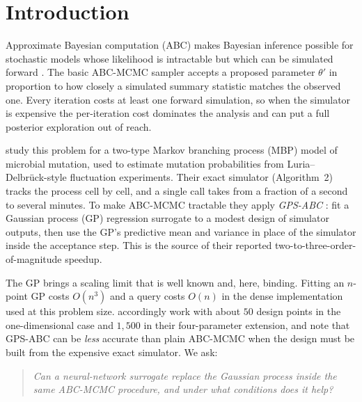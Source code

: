 \documentclass[sn-basic,iicol,pdflatex]{sn-jnl}
\begin{document}
\maketitle


\section{Introduction}
\label{sec:intro}

Approximate Bayesian computation (ABC) makes Bayesian inference possible for
stochastic models whose likelihood is intractable but which can be simulated
forward \citep{beaumont2002,marjoram2003,marin2012,sunnaker2013}. The basic ABC-MCMC sampler
\citep{marjoram2003} accepts a proposed parameter $\theta'$ in proportion to how
closely a simulated summary statistic matches the observed one. Every iteration
costs at least one forward simulation, so when the simulator is expensive the
per-iteration cost dominates the analysis and can put a full posterior
exploration out of reach.

\citet{lu2023} study this problem for a two-type Markov branching process (MBP)
model of microbial mutation, used to estimate mutation probabilities from
Luria--Delbr\"uck-style fluctuation experiments. Their exact simulator
(Algorithm~2) tracks the process cell by cell, and a single call takes from a
fraction of a second to several minutes. To make ABC-MCMC tractable they apply
\emph{GPS-ABC} \citep{meeds2014}: fit a Gaussian process (GP) regression \citep{rasmussen2006}
surrogate to a modest design of simulator outputs, then use the GP's predictive
mean and variance in place of the simulator inside the acceptance step. This is
the source of their reported two-to-three-order-of-magnitude speedup.

The GP brings a scaling limit that is well known and, here, binding. Fitting an
$n$-point GP costs $O(n^3)$ and a query costs $O(n)$ in the dense
implementation used at this problem size. \citet{lu2023} accordingly work with
about $50$ design points in the one-dimensional case and $1{,}500$ in their
four-parameter extension, and note that GPS-ABC can be \emph{less} accurate than
plain ABC-MCMC when the design must be built from the expensive exact simulator.
We ask:

\begin{quote}
\emph{Can a neural-network surrogate replace the Gaussian process inside the same
ABC-MCMC procedure, and under what conditions does it help?}
\end{quote}
\end{document}
